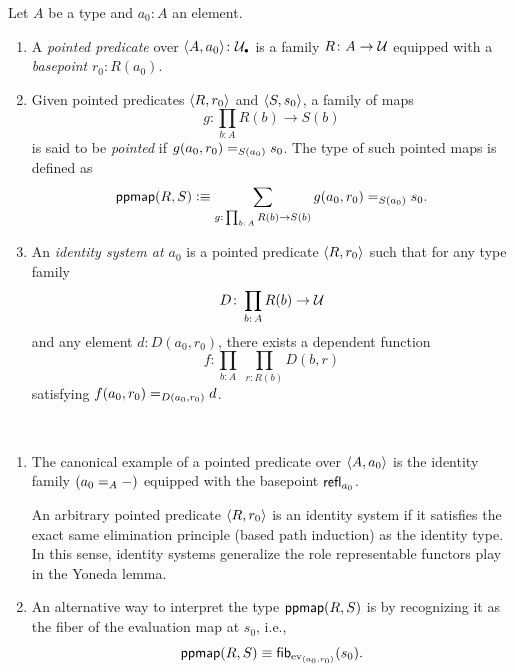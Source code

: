 \begin{defns}
    Let $A$ be a type and $a_0 \colon A$ an element.
    \begin{enumerate}[-]
        \item A \textsl{pointed predicate} over $\dep{A,a_0}\colon\puniv$ is a family $R\colon A\to\univ$ equipped with a \textsl{basepoint} $r_0\colon R(a_0)$.
        
        \item Given pointed predicates $\langle R,r_0\rangle$ and $\langle S,s_0\rangle$, a family of maps
        \[
            g\colon\prod_{b\colon A}R(b)\to S(b)
        \]
        is said to be \textsl{pointed} if $g(a_0,r_0)\mathrel{=_{S(a_0)}}s_0$. The type of such pointed maps is defined as
        \[
            \fun{ppmap}(R,S)\defeq
                \sum_{
                    g\colon\prod_{b\colon A}R(b)\to S(b)
                }
                g(a_0,r_0)\eq{S(a_0)}s_0.
        \]
        
        \item An \textsl{identity system at $a_0$} is a pointed predicate $\langle R,r_0\rangle$ such that for any type family
        \[
            D\colon\prod_{b\colon A}R(b)\to\univ
        \]
        and any element $d\colon D(a_0,r_0)$, there exists a dependent function
        \[
            f\colon
                \prod_{b\colon A}\;
                \prod_{r\colon R(b)}
                    D(b,r)
        \]
        satisfying $f(a_0,r_0)\mathrel{=_{D(a_0,r_0)}}d$.
    \end{enumerate}
\end{defns}

\begin{rems}\label{rem:ppmap-and-fibers}\ 
    \begin{enumerate}[-]
        \item The canonical example of a pointed predicate over $\langle A,a_0\rangle$ is the identity family $(a_0\mathrel{=_{A}}{\mathord-})$ equipped with the basepoint $\mathsf{refl}_{a_0}$.

        An arbitrary pointed predicate $\langle R,r_0\rangle$ is an identity system if it satisfies the exact same elimination principle (based path induction) as the identity type. In this sense, identity systems generalize the role representable functors play in the Yoneda lemma.

        \item An alternative way to interpret the type $\mathsf{ppmap}(R,S)$ is by recognizing it as the fiber of the evaluation map at $s_0$, i.e.,
        \begin{equation}\label{eq:ppmap-and-fibers}
            \mathsf{ppmap}(R,S)\equiv
                \mathsf{fib}_{{\operatorname{ev}}_{(a_0,r_0)}}(s_0).
        \end{equation}
    \end{enumerate}
\end{rems}

